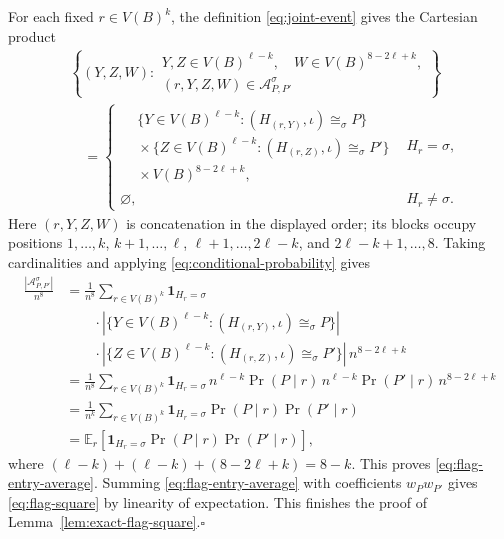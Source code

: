 \documentclass[11pt]{article}
\newcommand{\E}{\mathbb E}
\newcommand{\ind}{\mathbf 1}
\begin{document}
For each fixed $r\in V(B)^k$, the definition \eqref{eq:joint-event}
gives the Cartesian product
\[
\begin{aligned}
&\left\{(Y,Z,W):
\begin{array}{l}
Y,Z\in V(B)^{\ell-k},\quad W\in V(B)^{8-2\ell+k},\\
(r,Y,Z,W)\in\mathcal A^\sigma_{P,P'}
\end{array}\right\}\\
&\quad=
\begin{cases}
\begin{aligned}
&\{Y\in V(B)^{\ell-k}:(H_{(r,Y)},\iota)\cong_\sigma P\}\\
&{}\times\{Z\in V(B)^{\ell-k}:(H_{(r,Z)},\iota)\cong_\sigma P'\}\\
&{}\times V(B)^{8-2\ell+k},
\end{aligned}
&H_r=\sigma,\\[6pt]
\varnothing,&H_r\ne\sigma.
\end{cases}
\end{aligned}
\]
Here $(r,Y,Z,W)$ is concatenation in the displayed order; its blocks
occupy positions $1,\ldots,k$, $k+1,\ldots,\ell$,
$\ell+1,\ldots,2\ell-k$, and $2\ell-k+1,\ldots,8$.
Taking cardinalities and applying \eqref{eq:conditional-probability} gives
\begin{align*}
\frac{|\mathcal A^\sigma_{P,P'}|}{n^8}
&=\frac1{n^8}\sum_{r\in V(B)^k}\ind_{H_r=\sigma}\\
&\qquad{}\cdot
\left|\{Y\in V(B)^{\ell-k}:(H_{(r,Y)},\iota)\cong_\sigma P\}\right|\\
&\qquad{}\cdot
\left|\{Z\in V(B)^{\ell-k}:(H_{(r,Z)},\iota)\cong_\sigma P'\}\right|
\,n^{8-2\ell+k}\\
&=\frac1{n^8}\sum_{r\in V(B)^k}\ind_{H_r=\sigma}
\,n^{\ell-k}\Pr(P\mid r)\,
n^{\ell-k}\Pr(P'\mid r)\,n^{8-2\ell+k}\\
&=\frac1{n^k}\sum_{r\in V(B)^k}
\ind_{H_r=\sigma}\Pr(P\mid r)\Pr(P'\mid r)\\
&=\E_r\left[\ind_{H_r=\sigma}\Pr(P\mid r)\Pr(P'\mid r)\right],
\end{align*}
where $(\ell-k)+(\ell-k)+(8-2\ell+k)=8-k$.
This proves \eqref{eq:flag-entry-average}.
Summing \eqref{eq:flag-entry-average} with coefficients $w_Pw_{P'}$
gives \eqref{eq:flag-square} by linearity of expectation.
This finishes the proof of Lemma~\ref{lem:exact-flag-square}.\hfill$\square$
\end{document}
